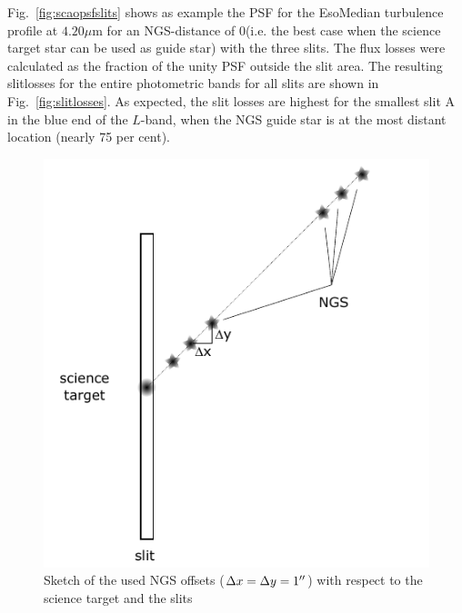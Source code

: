 Fig.~\ref{fig:scaopsfslits} shows as example the \ac{PSF} for the EsoMedian turbulence profile at $4.20\mu$m for an \ac{NGS}-distance of 0\arcsec  (i.e. the best case when the science target star can be used as guide star) with the three slits. The flux losses were calculated as the fraction of the unity \ac{PSF} outside the slit area. The resulting slitlosses for the entire photometric bands for all slits are shown in Fig.~\ref{fig:slitlosses}. As expected, the slit losses are highest for the smallest slit A in the blue end of the $L$-band, when the \ac{NGS} guide star is at the most distant location (nearly 75 per cent). %
\begin{figure}[ht!]
  \centering
  \includegraphics[width=0.5\linewidth]{figures/LSS_CrtAlg_files/ngs_offsets.pdf}
  \caption{Sketch of the used \ac{NGS} offsets ($\Delta x=\Delta y=1\hbox{$^{\prime\prime}$}$) with respect to the science target and the slits}
  \label{fig:ngsoffsets}
\end{figure}

